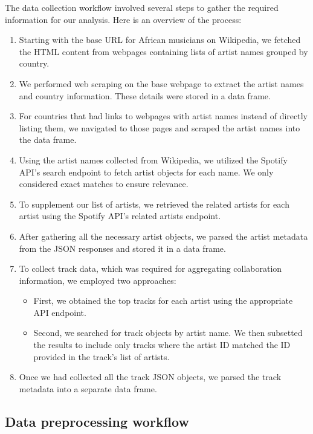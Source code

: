 \documentclass{article}
\begin{document}
The data collection workflow involved several steps to gather the required
information for our analysis. Here is an overview of the process:

\begin{enumerate}
    \item Starting with the base URL for African musicians on Wikipedia, we fetched the
          HTML content from webpages containing lists of artist names grouped by country.
    \item We performed web scraping on the base webpage to extract the artist names and
          country information. These details were stored in a data frame.
    \item For countries that had links to webpages with artist names instead of directly
          listing them, we navigated to those pages and scraped the artist names into the
          data frame.
    \item Using the artist names collected from Wikipedia, we utilized the Spotify API's
          search endpoint to fetch artist objects for each name. We only considered exact
          matches to ensure relevance.
    \item To supplement our list of artists, we retrieved the related artists for each
          artist using the Spotify API's related artists endpoint.
    \item After gathering all the necessary artist objects, we parsed the artist metadata
          from the JSON responses and stored it in a data frame.
    \item To collect track data, which was required for aggregating collaboration
          information, we employed two approaches:
          \begin{itemize}
              \item First, we obtained the top tracks for each artist using the appropriate API
                    endpoint.
              \item Second, we searched for track objects by artist name. We then subsetted the
                    results to include only tracks where the artist ID matched the ID provided in
                    the track's list of artists.
          \end{itemize}
    \item Once we had collected all the track JSON objects, we parsed the track metadata
          into a separate data frame.
\end{enumerate}

\subsection{Data preprocessing workflow}
\end{document}
